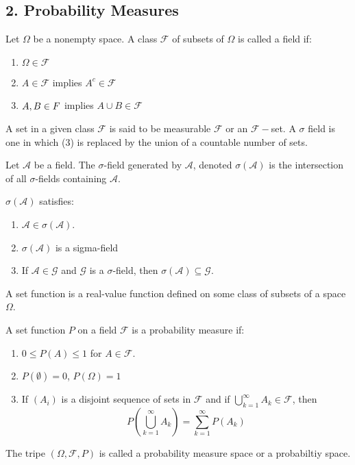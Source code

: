 \documentclass[11pt]{article}
\newcommand{\F}{\mathcal{F}}
\newcommand{\A}{\mathcal{A}}
\newcommand{\seq}{\subseteq}
\newcommand{\es}{\emptyset}
\newcommand{\mc}{\mathcal}
\newcommand{\un}{\cup}
\newenvironment{definition}[2][Definition]{\begin{trivlist}
\item[\hskip \labelsep {\bfseries #1}\hskip \labelsep {\bfseries #2.}]}{\end{trivlist}}
\newenvironment{rmrk}[2][Remark]{\begin{trivlist}
\item[\hskip \labelsep {\bfseries #1}\hskip \labelsep {\bfseries #2.}]}{\end{trivlist}}
\begin{document}
\pagebreak
\subsection*{2. Probability Measures}
\begin{definition}{1}
    Let $\Omega$ be a nonempty space. A class $\mc F$ of subsets of $\Omega$ is called a field if:
    \begin{enumerate}
        \item $\Omega \in \F$
        \item $A \in \F$ implies $A^c \in \F$
        \item $A, B \in \mc \F$ implies $A \un B \in \F$
    \end{enumerate}
    A set in a given class $\F$ is said to be measurable $\F$ or an $\F-$set. A $\sigma$ field is one in which (3) is replaced by the union of a countable number of sets.
\end{definition}

\begin{definition}{2}
    Let $\mc A$ be a field. The $\sigma$-field generated by $\mc A$, denoted $\sigma (\mc A)$ is the intersection of all $\sigma$-fields containing $\mc A$.
\end{definition}

\begin{rmrk}{3}
    $\sigma(\A)$ satisfies:
    \begin{enumerate}
        \item $\A \in \sigma(\A)$.
        \item $\sigma(\A)$ is a sigma-field
        \item If $\A \in \mc G$ and $\mc G$ is a $\sigma$-field, then $\sigma(\A) \seq \mc G$.
    \end{enumerate}
\end{rmrk}


\begin{definition}{4}
    A set function is a real-value function defined on some class of subsets of a space $\Omega$.
\end{definition}

\begin{definition}{5}
    A set function $P$ on a field $\F$ is a probability measure if:
    \begin{enumerate}
        \item $0 \leq P(A) \leq 1$ for $A \in \mc F$.
        \item $P(\es) = 0$, $P(\Omega) = 1$
        \item If $(A_i)$ is a disjoint sequence of sets in $\F$ and if $\bigcup_{k=1}^{\infty} A_k \in \F$, then
        \[ P \left ( \bigcup_{k=1}^{\infty} A_k \right) = \sum_{k=1}^{\infty} P(A_k) \]
    \end{enumerate}
    The tripe $(\Omega, \F, P)$ is called a probability measure space or a probabiltiy space.
\end{definition}
\end{document}
